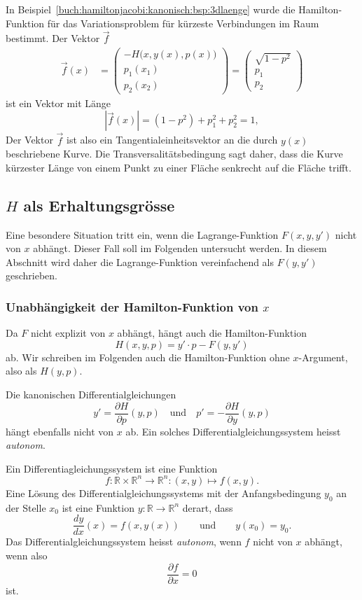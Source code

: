 \begin{beispiel}
In Beispiel~\ref{buch:hamiltonjacobi:kanonisch:bsp:3dlaenge} wurde
die Hamilton-Funktion für das Variationsproblem für kürzeste Verbindungen
im Raum bestimmt.
Der Vektor $\vec{f}$ 
\begin{align*}
\vec{f}(x)
&=
\begin{pmatrix}
-H\bigl(x,y(x),p(x)\bigr)\\
p_1(x_1)\\
p_2(x_2)
\end{pmatrix}
=
\begin{pmatrix}
\sqrt{1-p^2}\\
p_1\\
p_2
\end{pmatrix}
\end{align*}
ist ein Vektor mit Länge
\[
|\vec{f}(x)|
=
(1-p^2) + p_1^2+p_2^2
=
1,
\]
Der Vektor $\vec{f}$ ist also ein Tangentialeinheitsvektor an die
durch $y(x)$ beschriebene Kurve.
Die Transversalitätsbedingung sagt daher, dass die Kurve kürzester
Länge von einem Punkt zu einer Fläche senkrecht auf die Fläche trifft.
\end{beispiel}

%
%
\subsection{$H$ als Erhaltungsgrösse}
Eine besondere Situation tritt ein, wenn die Lagrange-Funktion $F(x,y,y')$
nicht von $x$ abhängt.
Dieser Fall soll im Folgenden untersucht werden.
In diesem Abschnitt wird daher die
Lagrange-Funktion vereinfachend als $F(y,y')$ geschrieben.

%
%
\subsubsection{Unabhängigkeit der Hamilton-Funktion von $x$}
Da $F$ nicht explizit von $x$ abhängt, hängt auch die
Hamilton-Funktion
\[
H(x,y,p)
=
y'\cdot p - F(y,y')
\]
ab.
Wir schreiben im Folgenden auch die Hamilton-Funktion ohne $x$-Argument,
also als $H(y,p)$.

Die kanonischen Differentialgleichungen
\[
y' = \frac{\partial H}{\partial p}(y,p)
\quad\text{und}\quad
p' = -\frac{\partial H}{\partial y}(y,p)
\]
hängt ebenfalls nicht von $x$ ab.
Ein solches Differentialgleichungssystem heisst {\em autonom}.
%

\begin{definition}
Ein Differentiagleichungssystem ist eine Funktion 
\[
f\colon \mathbb{R}\times \mathbb{R}^n\to\mathbb{R}^n
:
(x,y)\mapsto f(x,y).
\]
Eine Lösung des Differentialgleichungssystems mit der Anfangsbedingung
$y_0$ an der Stelle $x_0$ ist eine Funktion
$y\colon\mathbb{R}\to\mathbb{R}^n$ derart, dass 
\[
\frac{dy}{dx}(x)
=
f(x,y(x))
\qquad\text{und}\qquad
y(x_0)=y_0.
\]
Das Differentialgleichungssystem heisst {\em autonom}, wenn $f$ nicht von
%
$x$ abhängt, wenn also
\[
\frac{\partial f}{\partial x} = 0
\]
ist.
\end{definition}

